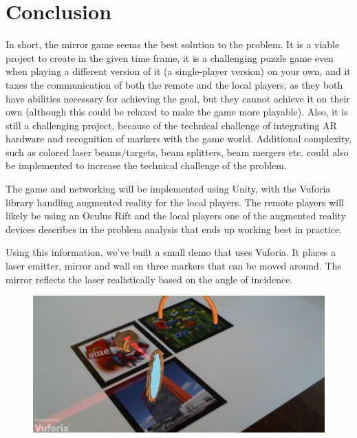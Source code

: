 \chapter{Conclusion} \label{cha:conclusion}
In short, the mirror game seems the best solution to the problem. It is a viable project
to create in the given time frame, it is a challenging puzzle game even when playing a
different version of it (a single-player version) on your own, and it taxes the communication
of both the remote and the local players, as they both have abilities necessary for
achieving the goal, but they cannot achieve it on their own (although this could be relaxed
to make the game more playable). Also, it is still a challenging project, because of the
technical challenge of integrating AR hardware and recognition of markers with the game
world. Additional complexity, such as colored laser beams/targets, beam splitters, beam mergers
etc. could also be implemented to increase the technical challenge of the problem.

The game and networking will be implemented using Unity, with the Vuforia library
handling augmented reality for the local players. The remote players will likely
be using an Oculus Rift and the local players one of the augmented reality devices
describes in the problem analysis that ends up working best in practice.

Using this information, we've built a small demo that uses Vuforia. It places
a laser emitter, mirror and wall on three markers that can be moved around. The
mirror reflects the laser realistically based on the angle of incidence.

\begin{figure}[h]
\includegraphics[width=\textwidth]{demo.png}
\end{figure}
